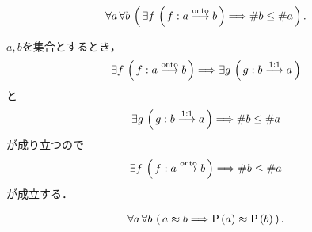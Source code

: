 	\begin{screen}
		\begin{thm}[全射が存在すれば濃度は大きい]
			\begin{align}
				\forall a\, \forall b\, \left(\, \exists f\, \left(\, f:a \overset{\mathrm{onto}}{\longrightarrow}  b\, \right)
				\Longrightarrow \# b \leq \# a\, \right).
			\end{align}
		\end{thm}
	\end{screen}
	
	\begin{prf}
		$a,b$を集合とするとき，
		\begin{align}
			\exists f\, \left(\, f:a \overset{\mathrm{onto}}{\longrightarrow} b\, \right)
			\Longrightarrow \exists g\, \left(\, g:b \overset{\mathrm{1:1}}{\longrightarrow}  a\, \right)
		\end{align}
		と
		\begin{align}
			\exists g\, \left(\, g:b \overset{\mathrm{1:1}}{\longrightarrow} a\, \right) \Longrightarrow \# b \leq \# a
		\end{align}
		が成り立つので
		\begin{align}
			\exists f\, \left(\, f:a \overset{\mathrm{onto}}{\longrightarrow} b\, \right) \Longrightarrow \# b \leq \# a
		\end{align}
		が成立する．
		\QED
	\end{prf}
	
	\begin{screen}
		\begin{thm}[対等な集合同士は冪も対等]
			\begin{align}
				\forall a\, \forall b\, \left(\, a \approx b \Longrightarrow \operatorname*{P} \left(a\right) \approx \operatorname*{P} \left(b\right)\, \right).
			\end{align}
		\end{thm}
	\end{screen}
	

